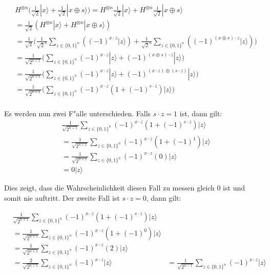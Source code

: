 \begin{refsection}
\begin{align*}
    &H^{ \otimes n } \biggl( 
                     \frac{1}{\sqrt{2}} |x\rangle + 
                     \frac{1}{\sqrt{2}} |x \oplus s\rangle 
                     \biggr)
    = H^{ \otimes n } \frac{1}{\sqrt{2}} |x\rangle + 
       H^{ \otimes n } \frac{1}{\sqrt{2}} |x \oplus s\rangle 
    \\ 
    &= \frac1{\sqrt{2}} ( H^{ \otimes n } |x\rangle + H^{ \otimes n } |x \oplus s\rangle )
    \\
    &= \frac1{\sqrt{2}}
       \biggl( \frac1{\sqrt{2}^n} \sum_{z \in \{0,1\}^n} {( (-1)^{x \cdot z} |z\rangle )} + 
               \frac1{\sqrt{2}^n}  \sum_{z \in \{0,1\}^n} { ( (-1)^{(x \oplus s) \cdot z } |z\rangle)}
       \biggr)
    \\
    &= \frac1{\sqrt{2^{n + 1}}}
       \biggl( \sum_{z \in \{0,1\}^n}  { 
                   (-1)^{x \cdot z} |z\rangle + (-1)^{(x \oplus s) \cdot z } |z\rangle 
               } 
       \biggr)
    \\
    &= \frac1{\sqrt{2^{n + 1}}}
       \biggl( \sum_{z \in \{0,1\}^n}  { 
                  (-1)^{x \cdot z} |z\rangle + (-1)^{(x \cdot z) \oplus ( s \cdot z) } |z\rangle 
               } 
       \biggr)
    \\
    &= \frac1{\sqrt{2^{n + 1}}}
       \biggl( 
          \sum_{z \in \{0,1\}^n}  { (-1)^{x \cdot z} ( 1 + (-1)^{ s \cdot z}) |z\rangle } 
       \biggr)
    \\
\end{align*}

Es werden nun zwei F"alle unterschieden. Falls $s \cdot z = 1$ ist, dann gilt:
\begin{align*}
    &\frac1{\sqrt{2^{n + 1}}}
      \sum_{z \in \{0,1\}^n}  { (-1)^{x \cdot z} ( 1 + (-1)^{ s \cdot z}) |z\rangle } 
    \\
    &= 
    \frac1{\sqrt{2^{n + 1}}}
      \sum_{z \in \{0,1\}^n}  { (-1)^{x \cdot z} ( 1 + (-1)^1) |z\rangle } 
    \\
    &= 
    \frac1{\sqrt{2^{n + 1}}}
      \sum_{z \in \{0,1\}^n}  { (-1)^{x \cdot z} (0) |z\rangle } 
    \\
    &=
    0 |z\rangle
\end{align*}

Dies zeigt, dass die Wahrscheinlichkeit diesen Fall zu messen gleich 0 ist und
somit nie auftritt. Der zweite Fall ist $s \cdot z = 0$, dann gilt:

\begin{align*}
    &\frac1{\sqrt{2^{n + 1}}}
      \sum_{z \in \{0,1\}^n}  { (-1)^{x \cdot z} ( 1 + (-1)^{ s \cdot z}) |z\rangle } 
    \\
    &= 
    \frac1{\sqrt{2^{n + 1}}}
      \sum_{z \in \{0,1\}^n}  { (-1)^{x \cdot z} ( 1 + (-1)^0) |z\rangle } 
    \\
    &= 
    \frac1{\sqrt{2^{n + 1}}}
      \sum_{z \in \{0,1\}^n}  { (-1)^{x \cdot z} (2) |z\rangle } 
    \\
    &= 
    \frac{2}{\sqrt{2^{n + 1}}} 
      \sum_{z \in \{0,1\}^n}  { (-1)^{x \cdot z}|z\rangle } 
    &= 
    \frac1{\sqrt{2^{n - 1}}} 
      \sum_{z \in \{0,1\}^n}  { (-1)^{x \cdot z}|z\rangle } 
\end{align*}


\end{refsection}
